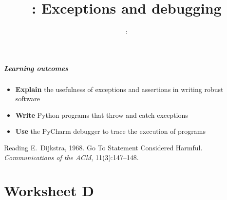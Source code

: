 \usepackage{../../beamerthemeFalmouthGamesAcademy}
\usepackage{multimedia}
\graphicspath{ {../../} }

\lstset{language=Python
}

\usepackage[normalem]{ulem}
\usepackage{wasysym}

\usepackage{pdfpages}

\usetikzlibrary{arrows,automata}




\title{\sessionnumber: Exceptions and debugging}
\subtitle{\modulecode: \moduletitle}

\frame{\titlepage} 

\begin{frame}
	\frametitle{Learning outcomes}
	\begin{itemize}
		\item \textbf{Explain} the usefulness of exceptions and assertions in writing robust software
\item \textbf{Write} Python programs that throw and catch exceptions
\item \textbf{Use} the PyCharm debugger to trace the execution of programs
	\end{itemize}
\end{frame}

\begin{frame}{Reading}
	E.\ Dijkstra, 1968.
	Go To Statement Considered Harmful.
	\emph{Communications of the ACM},
	11(3):147--148.
\end{frame}





\part{Worksheet D}
\frame{\partpage}


